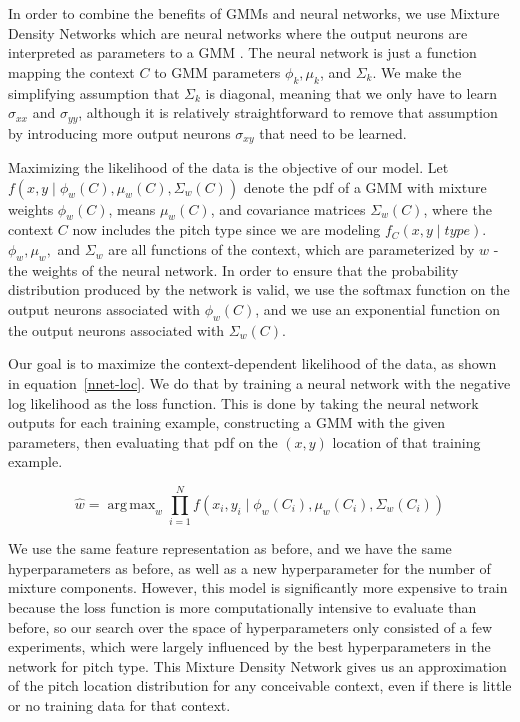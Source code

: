 \documentclass{article}
\DeclareMathOperator*{\argmax}{arg\,max}
\begin{document}
In order to combine the benefits of GMMs and neural networks, we use Mixture Density Networks which are neural networks where the output neurons are interpreted as parameters to a GMM \cite{Williams:1996:UNN:1362161.1362171}.  The neural network is just a function  mapping the context $C$ to GMM parameters $ \phi_k, \mu_k $, and $ \Sigma_k $.  We make the simplifying assumption that $ \Sigma_k $ is diagonal, meaning that we only have to learn $ \sigma_{xx} $ and $ \sigma_{yy} $, although it is relatively straightforward to remove that assumption by introducing more output neurons $ \sigma_{xy} $ that need to be learned.  

Maximizing the likelihood of the data is the objective of our model.  Let $ f(x, y \mid \phi_w(C), \mu_w(C), \Sigma_w(C)) $ denote the pdf of a GMM with mixture weights $ \phi_w(C) $, means $ \mu_w(C) $, and covariance matrices $ \Sigma_w(C) $, where the context $C$ now includes the pitch type since we are modeling $ f_C(x,y \mid type) $.  $\phi_w, \mu_w, $ and $ \Sigma_w $ are all functions of the context, which are parameterized by $w$ - the weights of the neural network.  In order to ensure that the probability distribution produced by the network is valid, we use the softmax function on the output neurons associated with $ \phi_w(C) $, and we use an exponential function on the output neurons associated with $ \Sigma_w(C) $.

Our goal is to maximize the context-dependent likelihood of the data, as shown in equation~\ref{nnet-loc}.  We do that by training a neural network with the negative log likelihood as the loss function.  This is done by taking the neural network outputs for each training example, constructing a GMM with the given parameters, then evaluating that pdf on the $(x,y)$ location of that training example.  

\begin{equation} \label{nnet-loc}
\hat{w} = \argmax_{w} \prod_{i=1}^N f(x_i, y_i \mid \phi_w(C_i), \mu_w(C_i), \Sigma_w(C_i))
\end{equation}

We use the same feature representation as before, and we have the same hyperparameters as before, as well as a new hyperparameter for the number of mixture components.  However, this model is significantly more expensive to train because the loss function is more computationally intensive to evaluate than before, so our search over the space of hyperparameters only consisted of a few experiments, which were largely influenced by the best hyperparameters in the network for pitch type.  This Mixture Density Network gives us an approximation of the pitch location distribution for any conceivable context, even if there is little or no training data for that context.
\end{document}

